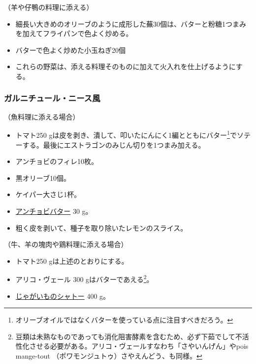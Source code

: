 \begin{recette}


（羊や仔鴨の料理に添える）

\begin{itemize}
\item
  細長い大きめのオリーブのように成形した蕪30個は、バターと粉糖1つまみを加えてフライパンで色よく炒める。
\item
  バターで色よく炒めた小玉ねぎ20個
\item
  これらの野菜は、添える料理そのものに加えて火入れを仕上げるようにする。
\end{itemize}

\atoaki{}

\hypertarget{garniture-a-la-nicoise}{%
\subsubsection{ガルニチュール・ニース風}\label{garniture-a-la-nicoise}}



（魚料理に添える場合）

\begin{itemize}
\item
  トマト250
  gは皮を剥き、潰して、叩いたにんにく1編とともにバター\footnote{オリーブオイルではなくバターを使っている点に注目すべきだろう。}でソテーする。最後にエストラゴンのみじん切りを1つまみ加える。
\item
  アンチョビのフィレ10枚。
\item
  黒オリーブ10個。
\item
  ケイパー大さじ1杯。
\item
  \protect\hyperlink{beurre-d-anchois}{アンチョビバター} 30 g。
\item
  粗く皮を剥いて、種子を取り除いたレモンのスライス。
\end{itemize}

（牛、羊の塊肉や鶏料理に添える場合）

\begin{itemize}
\item
  トマト250 gは上述のとおりにする。
\item
  アリコ・ヴェール 300 gはバターであえる\footnote{豆類は未熟なものであっても消化阻害酵素を含むため、必ず下茹でして不活性化させる必要がある。アリコ・ヴェールすなわち「さやいんげん」やpois
    mange-tout （ポワモンジュトゥ）さやえんどう、も同様。}。
\item
  \protect\hyperlink{pommes-de-terre-chateau}{じゃがいものシャトー} 400
  g。
\end{itemize}


\end{recette}
